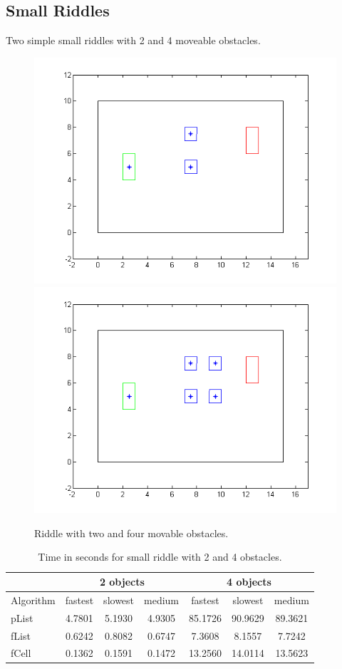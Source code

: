 \subsection{Small Riddles}
Two simple small riddles with 2 and 4 moveable obstacles.
\begin{figure}[H]
\includegraphics[scale = 0.5]{riddle2}
\includegraphics[scale = 0.5]{riddle4}
\caption{Riddle with two and four movable obstacles.}
\end{figure}
\begin{table}[H]
\centering
\begin{tabular}{l||c|c|c||c|c|c}
& \multicolumn{3}{c||}{2 objects} &\multicolumn{3}{c}{4 objects}\\\hline\hline
Algorithm& fastest & slowest & medium & fastest & slowest & medium\\\hline
pList & 4.7801& 5.1930&4.9305& 85.1726 & 90.9629 & 89.3621\\
fList  & 0.6242 & 0.8082& 0.6747  & 7.3608 & 8.1557 & 7.7242\\
fCell & 0.1362 & 0.1591 & 0.1472 & 13.2560 & 14.0114 & 13.5623\\
\end{tabular}
\caption{Time in seconds for small riddle with 2 and 4 obstacles.}
\end{table}

